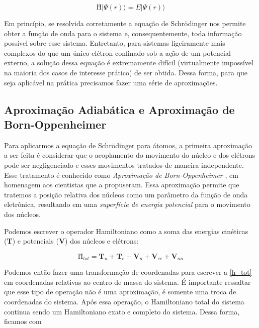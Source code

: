 	\begin{equation}
	\label{schrodinger_it}
	\textbf{\^H}|\Psi(r)\rangle = E|\Psi(r)\rangle
	\end{equation}
	
	Em princípio, se resolvida corretamente a equação de Schrödinger nos permite obter a função de onda para o sistema e, consequentemente, toda informação possível sobre esse sistema. Entretanto, para sistemas ligeiramente mais complexos do que um único elétron confinado sob a ação de um potencial externo, a solução dessa equação é extremamente difícil (virtualmente impossível na maioria dos casos de interesse prático) de ser obtida. Dessa forma, para que seja aplicável na prática precisamos fazer uma série de aproximações. \cite{jensen2017introduction, kaufman1972accurate, levine2000quantum, szabo2012modern}
	
	\subsection{Aproximação Adiabática e Aproximação de Born-Oppenheimer}
	
	Para aplicarmos a equação de Schrödinger para átomos, a primeira aproximação a ser feita é considerar que o acoplamento do movimento do núcleo e dos elétrons pode ser negligenciado e esses movimentos tratados de maneira independente. Esse tratamento é conhecido como \textit{Aproximação de Born-Oppenheimer} \cite{born1927quantentheorie} , em homenagem aos cientistas que a propuseram. Essa aproximação permite que tratemos a posição relativa dos núcleos como um parâmetro da função de onda eletrônica, resultando em uma \textit{superfície de energia potencial} para o movimento dos núcleos. 
	
	Podemos escrever o operador Hamiltoniano como a soma das energias cinéticas (\textbf{T}) e potenciais (\textbf{V}) dos núcleos e elétrons:
	
	\begin{equation}
	\label{h_tot}
	\textbf{\^H$_{tot}$} = \textbf{\^T$_{n}$} + \textbf{\^T$_{e}$} + \textbf{\^V$_{n}$} + \textbf{\^V$_{ee}$} + \textbf{\^V$_{nn}$}
	\end{equation}
	
	Podemos então fazer uma transformação de coordenadas para escrever a \autoref{h_tot} em coordenadas relativas ao centro de massa do sistema. É importante ressaltar que esse tipo de operação não é uma aproximação, é somente uma troca de coordenadas do sistema. Após essa operação, o Hamiltoniano total do sistema continua sendo um Hamiltoniano exato e completo do sistema. Dessa forma, ficamos com
	
